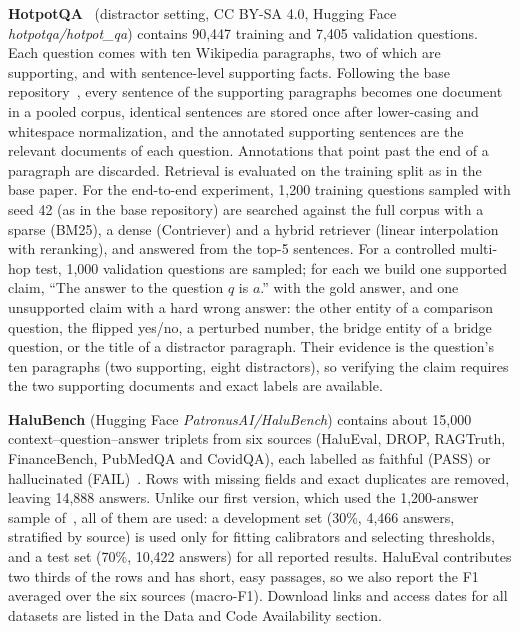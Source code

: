 \documentclass[conference]{IEEEtran}
\begin{document}
\textbf{HotpotQA}~\cite{yang_hotpot} (distractor setting, CC BY-SA 4.0, Hugging Face \textit{hotpotqa/hotpot\_qa}) contains 90,447 training and 7,405 validation questions. Each question comes with ten Wikipedia paragraphs, two of which are supporting, and with sentence-level supporting facts. Following the base repository~\cite{mala_ml}, every sentence of the supporting paragraphs becomes one document in a pooled corpus, identical sentences are stored once after lower-casing and whitespace normalization, and the annotated supporting sentences are the relevant documents of each question. Annotations that point past the end of a paragraph are discarded. Retrieval is evaluated on the training split as in the base paper. For the end-to-end experiment, 1,200 training questions sampled with seed 42 (as in the base repository) are searched against the full corpus with a sparse (BM25), a dense (Contriever) and a hybrid retriever (linear interpolation with reranking), and answered from the top-5 sentences. For a controlled multi-hop test, 1,000 validation questions are sampled; for each we build one supported claim, ``The answer to the question $q$ is $a$.'' with the gold answer, and one unsupported claim with a hard wrong answer: the other entity of a comparison question, the flipped yes/no, a perturbed number, the bridge entity of a bridge question, or the title of a distractor paragraph. Their evidence is the question's ten paragraphs (two supporting, eight distractors), so verifying the claim requires the two supporting documents and exact labels are available.

\textbf{HaluBench} (Hugging Face \textit{PatronusAI/HaluBench}) contains about 15,000 context--question--answer triplets from six sources (HaluEval, DROP, RAGTruth, FinanceBench, PubMedQA and CovidQA), each labelled as faithful (PASS) or hallucinated (FAIL)~\cite{mala_ml}. Rows with missing fields and exact duplicates are removed, leaving 14,888 answers. Unlike our first version, which used the 1,200-answer sample of~\cite{mala_ml}, all of them are used: a development set (30\%, 4,466 answers, stratified by source) is used only for fitting calibrators and selecting thresholds, and a test set (70\%, 10,422 answers) for all reported results. HaluEval contributes two thirds of the rows and has short, easy passages, so we also report the F1 averaged over the six sources (macro-F1). Download links and access dates for all datasets are listed in the Data and Code Availability section.
\end{document}
